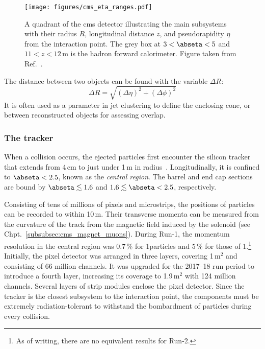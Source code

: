 \begin{figure}[htbp]
    \centering
    \texttt{[image: figures/cms\_eta\_ranges.pdf]}
    \caption[A quadrant of the CMS detector illustrating the main subsystems with their radius, longitudinal distance, and pseudorapidity from the interaction point]{A quadrant of the \acrshort{cms} detector illustrating the main subsystems with their radius $R$, longitudinal distance $z$, and pseudorapidity $\eta$ from the interaction point. The grey box at $\text{3} < \abseta < \text{5}$ and $\text{11} < z < \text{12}$\,m is the hadron forward calorimeter. Figure taken from Ref.~.}
    \label{fig:cms_eta_bounds}
\end{figure}

The distance between two objects can be found with the variable $\Delta R$:
\begin{equation}
\Delta R = \sqrt{(\Delta \eta)^2 + (\Delta \phi)^2}
\label{eq:delta_r}
\end{equation}
It is often used as a parameter in \gls{jet} clustering to define the enclosing cone, or between reconstructed objects for assessing overlap.




\subsubsection{The tracker}
\label{subsubsec:cms_tracker}

When a collision occurs, the ejected particles first encounter the silicon tracker that extends from 4\,cm to just under 1\,m in radius~\cite{Karimäki:368412,CERN-LHCC-2000-016}. Longitudinally, it is confined to $\abseta < \text{2.5}$, known as the \emph{central region}. The barrel and end cap sections are bound by $\abseta \lesssim \text{1.6}$ and $\text{1.6} \lesssim \abseta < \text{2.5}$, respectively.

Consisting of tens of millions of pixels and microstrips, the positions of particles can be recorded to within 10\,\si{\micro}m. Their transverse momenta can be measured from the curvature of the track from the magnetic field induced by the solenoid (see Chpt.~\ref{subsubsec:cms_magnet_muons}). During Run-1, the momentum resolution in the central region was 0.7\,\% for 1\GeVc particles and 5\,\% for those of 1\TeVc.\footnote{As of writing, there are no equivalent results for Run-2.} Initially, the pixel detector was arranged in three layers, covering 1\,m$^2$ and consisting of 66 million channels. It was upgraded for the 2017--18 run period to introduce a fourth layer, increasing its coverage to 1.9\,m$^2$ with 124 million channels. Several layers of strip modules enclose the pixel detector. Since the tracker is the closest subsystem to the interaction point, the components must be extremely radiation-tolerant to withstand the bombardment of particles during every collision.

